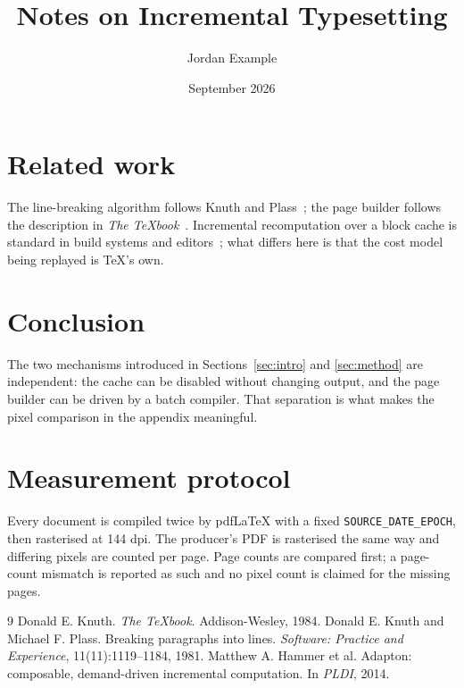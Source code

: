\documentclass[12pt]{article}
\title{Notes on Incremental Typesetting}
\author{Jordan Example}
\date{September 2026}
\begin{document}
\maketitle




\section{Related work}
The line-breaking algorithm follows Knuth and Plass~\cite{plass81}; the
page builder follows the description in \emph{The \TeX book}~\cite{knuth84}.
Incremental recomputation over a block cache is standard in build systems
and editors~\cite{adapton}; what differs here is that the cost model being
replayed is TeX's own.

\section{Conclusion}
The two mechanisms introduced in Sections~\ref{sec:intro} and
\ref{sec:method} are independent: the cache can be disabled without changing
output, and the page builder can be driven by a batch compiler. That
separation is what makes the pixel comparison in the appendix meaningful.

\appendix
\section{Measurement protocol}\label{app:protocol}
Every document is compiled twice by pdfLaTeX with a fixed
\texttt{SOURCE\_DATE\_EPOCH}, then rasterised at 144 dpi. The producer's
PDF is rasterised the same way and differing pixels are counted per page.
Page counts are compared first; a page-count mismatch is reported as such
and no pixel count is claimed for the missing pages.

\begin{thebibliography}{9}
 Donald E. Knuth. \emph{The \TeX book}. Addison-Wesley, 1984.
 Donald E. Knuth and Michael F. Plass. Breaking paragraphs
  into lines. \emph{Software: Practice and Experience}, 11(11):1119--1184, 1981.
 Matthew A. Hammer et al. Adapton: composable,
  demand-driven incremental computation. In \emph{PLDI}, 2014.
\end{thebibliography}
\end{document}
